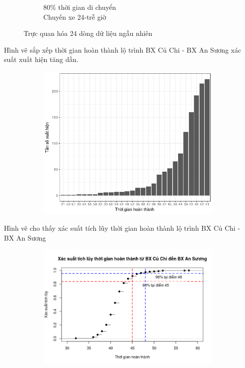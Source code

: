 \documentclass[a4paper, 13pt]{report}
\begin{document}
\begin{figure}
\begin{subfigure}[b]{0.25\textwidth}
                \caption*{80\% thời gian di chuyển\\Chuyến xe 24-trễ giờ}
        \end{subfigure}
	\caption{Trực quan hóa 24 dòng dữ liệu ngẫu nhiên}
\end{figure}
\FloatBarrier
Hình vẽ sắp xếp thời gian hoàn thành lộ trình BX Củ Chi - BX An Sương xác suất xuất hiện tăng dần.\\
\begin{figure}[h!]
        \begin{subfigure}[b]{0.5\textwidth}
                \label{tab:example}
                \includegraphics[width=\linewidth]{finishTime_CC_AS_Order}
        \end{subfigure}%
\end{figure}
Hình vẽ cho thấy xác suất tích lũy thời gian hoàn thành lộ trình BX Củ Chi - BX An Sương \\
\begin{figure}[h!]
        \begin{subfigure}[b]{0.7\textwidth}
        		\label{tab:example2}
                \includegraphics[width=\linewidth]{finishTime_CC_AS_ACC_Line}
        \end{subfigure}%
\end{figure}
\end{document}
